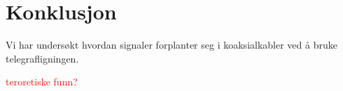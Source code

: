 \section{Konklusjon}
Vi har undersøkt hvordan signaler forplanter seg i koaksialkabler ved å bruke telegrafligningen.


\textcolor{red}{teroretiske funn?}